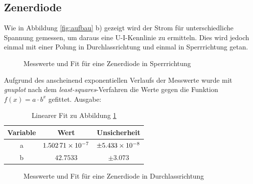 \subsection{Zenerdiode}
Wie in Abbildung \ref{fig:aufbau} b) gezeigt wird der Strom für unterschiedliche Spannung gemessen, um daraus eine U-I-Kennlinie zu ermitteln. Dies wird jedoch einmal mit einer Polung in Durchlassrichtung und einmal in Sperrrichtung getan.
\begin{figure}[H]
\centering
{}
\caption{Messwerte und Fit für eine Zenerdiode in Sperrrichtung}
\label{fig:diodesperr}
\end{figure}
Aufgrund des anscheinend exponentiellen Verlaufs der Messwerte wurde mit \emph{gnuplot} nach dem \emph{least-squares}-Verfahren die Werte gegen die Funktion $f(x)=a\cdot b^x$ gefittet. Ausgabe:
\begin{table}[H]
  \centering
  \begin{tabular}{c | c | c }
    Variable & Wert & Unsicherheit\\ \hline
    a & $\num{1.50271d-7}$ & $\pm\num{5.433d-8}$ \\
    b & $\num{42.7533}$ & $\pm\num{3.073}$
  \end{tabular}
  \caption{Linearer Fit zu Abbildung \ref{fig:diodesperr}}
  \label{tab:fitdiodesperr}
\end{table}
\begin{figure}[H]
\centering
{}
\caption{Messwerte und Fit für eine Zenerdiode in Durchlassrichtung}
\label{fig:diodedurch}
\end{figure}
